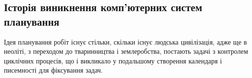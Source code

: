 \subsection{Історія виникнення комп’ютерних систем планування}

Ідея планування робіт існує стільки, скільки існує людська цивілізація, адже ще в неоліті, з переходом до тваринництва і землеробства, постають задачі з контролем циклічних процесів, що і викликало у подальшому створення календаря і писемності для фіксування задач.
